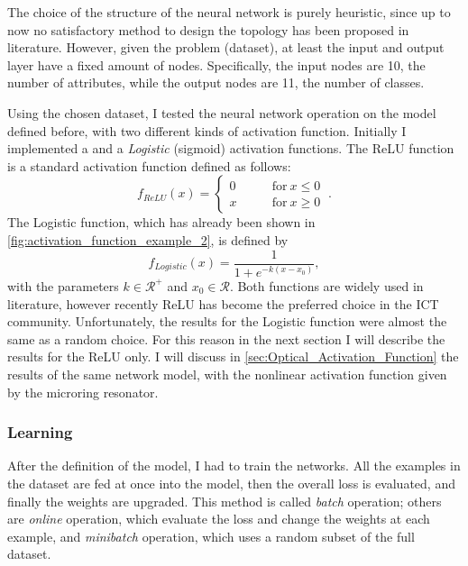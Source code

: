 The choice of the structure of the neural network is purely heuristic, since up to now no satisfactory method to design the topology has been proposed in literature.
However, given the problem (dataset), at least the input and output layer have a fixed amount of nodes.
Specifically, the input nodes are \num{10}, the number of attributes, while the output nodes are \num{11}, the number of classes.

Using the chosen dataset, I tested the neural network operation on the model defined before, with two different kinds of activation function.
Initially I implemented a  and a \textit{Logistic} (sigmoid) activation functions.
The \acs{ReLU} function is a standard activation function defined as follows:
\begin{equation}
f_{ReLU}(x) =
\begin{cases}
	0 & \qquad \mathrm{for}~ x\leq 0\\
	x & \qquad \mathrm{for}~ x\geq 0
\end{cases}~.
\label{eq:relu}
\end{equation}
The Logistic function, which has already been shown in \autoref{fig:activation_function_example_2}, is defined by
\begin{equation}
f_{Logistic}(x) = \frac{1}{1+e^{-k\left(x-x_0\right)}},
\end{equation}
with the parameters $k\in \mathcal{R}^+$ and $x_0\in \mathcal{R}$.
Both functions are widely used in literature, however recently \acs{ReLU} has become the preferred choice in the \ac{ICT} community.
Unfortunately, the results for the Logistic function were almost the same as a random choice.
For this reason in the next section I will describe the results for the \acs{ReLU} only.
I will discuss in \autoref{sec:Optical_Activation_Function} the results of the same network model, with the nonlinear activation function given by the microring resonator.

\subsubsection{Learning}
After the definition of the model, I had to train the networks.
All the examples in the dataset are fed at once into the model, then the overall loss is evaluated, and finally the weights are upgraded.
This method is called \textit{batch} operation; others are \textit{online} operation, which evaluate the loss and change the weights at each example, and \textit{minibatch} operation, which uses a random subset of the full dataset.

